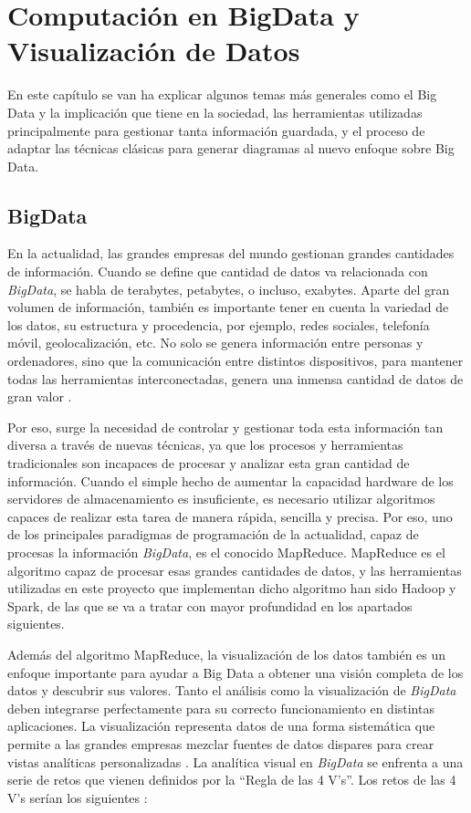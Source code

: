\chapter{Computación en BigData y Visualización de Datos}

En este capítulo se van ha explicar algunos temas más generales como el Big Data y la implicación que tiene en la sociedad, las herramientas utilizadas principalmente para gestionar tanta información guardada, y el proceso de adaptar las técnicas clásicas para generar diagramas al nuevo enfoque sobre Big Data.

\section{BigData}

En la actualidad, las grandes empresas del mundo gestionan grandes cantidades de información. Cuando se define que cantidad de datos va relacionada con \textit{BigData}, se habla de terabytes, petabytes, o incluso, exabytes. Aparte del gran volumen de información, también es importante tener en cuenta la variedad de los datos, su estructura y procedencia, por ejemplo, redes sociales, telefonía móvil, geolocalización, etc. No solo se genera información entre personas y ordenadores, sino que la comunicación entre distintos dispositivos, para mantener todas las herramientas interconectadas, genera una inmensa cantidad de datos de gran valor \cite{BigDataIntro}. 

Por eso, surge la necesidad de controlar y gestionar toda esta información tan diversa a través de nuevas técnicas, ya que los procesos y herramientas tradicionales son incapaces de procesar y analizar esta gran cantidad de información. Cuando el simple hecho de aumentar la capacidad hardware de los servidores de almacenamiento es insuficiente, es necesario utilizar algoritmos capaces de realizar esta tarea de manera rápida, sencilla y precisa. Por eso, uno de los principales paradigmas de programación de la actualidad, capaz de procesas la información \textit{BigData}, es el conocido MapReduce. MapReduce es el algoritmo capaz de procesar esas grandes cantidades de datos, y las herramientas utilizadas en este proyecto que implementan dicho algoritmo han sido Hadoop y Spark, de las que se va a tratar con mayor profundidad en los apartados siguientes.

Además del algoritmo MapReduce, la visualización de los datos también es un enfoque importante para ayudar a Big Data a obtener una visión completa de los datos y descubrir sus valores. Tanto el análisis como la visualización de \textit{BigData} deben integrarse perfectamente para su correcto funcionamiento en distintas aplicaciones. La visualización representa datos de una forma sistemática que permite a las grandes empresas mezclar fuentes de datos dispares para crear vistas analíticas personalizadas \cite{BigDataVisualization}. La analítica visual en \textit{BigData} se enfrenta a una serie de retos que vienen definidos por la “Regla de las 4 V’s”. Los retos de las 4 V’s serían los siguientes \cite{OverviewBigDataVis}: 

